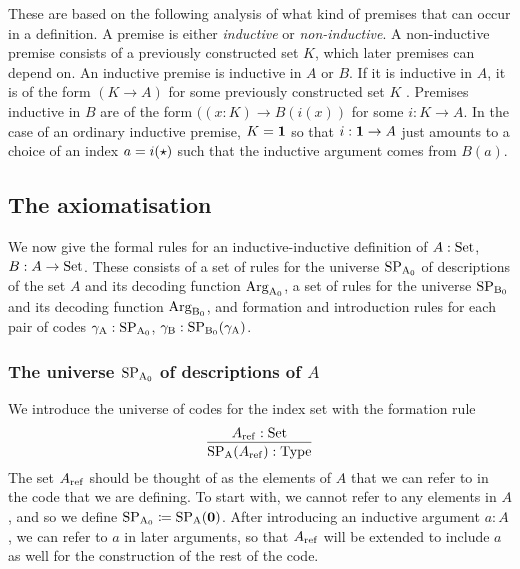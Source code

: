 \documentclass{article}
\begin{document}
These are based on the following analysis of what kind of premises
that can occur in a definition. A premise is either \emph{inductive}
or \emph{non-inductive}. A non-inductive premise consists of a
previously constructed set $K$, which later premises can depend on. An
inductive premise is inductive in $A$ or $B$. If it is inductive in
$A$, it is of the form $(K \to A)$ for some previously constructed set
$K$%
. Premises inductive in $B$ are of the form $((x : K) \to
B(i(x))$ for some $i : K \to A$. In the case of an ordinary inductive
premise, $K = \mathbf{1}$ so that $i : \mathbf{1} \to A$ just amounts to a choice
of an index $a = i(\star)$ such that the inductive argument comes
from $B(a)$.


\subsection{The axiomatisation}
\label{sec:formal-axiomatisation}

We now give the formal rules for an inductive-inductive definition of
$A : \text{Set}$, $B : A \to \text{Set}$. These consists of a set of rules for the
universe $\text{SP}_{\mathrm{A}_0}$ of descriptions of the set $A$ and its decoding
function $\text{Arg}_{\mathrm{A}_0}$, a set of rules for the universe $\text{SP}_{\mathrm{B}_0}$ and its
decoding function $\text{Arg}_{\mathrm{B}_0}$, and formation and introduction rules for
each pair of codes $\gamma_{\mathrm{A}} : \text{SP}_{\mathrm{A}_0}$, $\gamma_{\mathrm{B}} : \text{SP}_{\mathrm{B}_0}(\gamma_{\mathrm{A}})$.

\subsubsection{The universe $\text{SP}_{\mathrm{A}_0}$ of descriptions of $A$}
\label{sec:SPA}
  
We introduce the universe of codes for the index set with the
formation rule
\[
\infer{\SPA(\Aref) : \TYPE}{\Aref : \Set}
\]
The set $A_{\mathrm{ref}}$ should be thought of as the elements of $A$ that we
can refer to in the code that we are defining. To start with, we
cannot refer to any elements in $A$, and so we define $\text{SP}_{\mathrm{A}_0} \coloneqq
\text{SP}_{\mathrm{A}}(\mathbf{0})$. After introducing an inductive argument $a : A$, we can
refer to $a$ in later arguments, so that $A_{\mathrm{ref}}$ will be extended to
include $a$ as well for the construction of the rest of the code.
\end{document}
